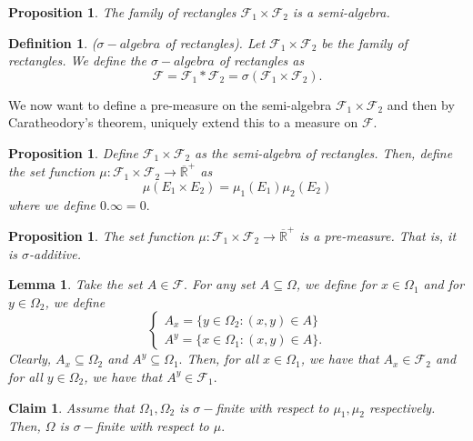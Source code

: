\documentclass[twoside]{article}
\newtheorem{lemma}[theorem]{Lemma}
\newtheorem{proposition}[theorem]{Proposition}
\newtheorem{claim}[theorem]{Claim}
\newtheorem{definition}[theorem]{Definition}
\newcommand{\sigmalgebra}{\mathcal{F}}
\newcommand{\sa}{\sigma-algebra}
\newcommand{\positiveextendedreal}{\overline{\mathbb{R}}^+}
\begin{document}
\begin{proposition}The family of rectangles $\sigmalgebra_1 \times \sigmalgebra_2$ is a semi-algebra.
\end{proposition}

\begin{definition}($\sa$ of rectangles). Let $\sigmalgebra_1 \times \sigmalgebra_2$ be the family of rectangles. We define the $\sa$ of rectangles as 
$$
\sigmalgebra = \sigmalgebra_1 * \sigmalgebra_2 = \sigma(\sigmalgebra_1 \times \sigmalgebra_2).
$$
\end{definition}

We now want to define a pre-measure on the semi-algebra $\sigmalgebra_1 \times \sigmalgebra_2$ and then by Caratheodory's theorem, uniquely extend this to a measure on $\sigmalgebra.$

\begin{proposition}Define $\sigmalgebra_1 \times \sigmalgebra_2$ as the semi-algebra of rectangles. Then, define the set function $\mu: \sigmalgebra_1 \times \sigmalgebra_2 \rightarrow \positiveextendedreal$ as 
$$
\mu(E_1 \times E_2) = \mu_1(E_1)\mu_2(E_2)
$$
where we define $0.\infty = 0.$
\end{proposition}

\begin{proposition}The set function $\mu: \sigmalgebra_1 \times \sigmalgebra_2 \rightarrow \positiveextendedreal$ is a pre-measure. That is, it is $\sigma$-additive.
\end{proposition}

\begin{lemma}Take the set $A \in \sigmalgebra.$ For any set $A \subseteq \Omega$, we define for $x \in \Omega_1$ and for $y \in \Omega_2$, we define
$$
\begin{cases}
A_x = \{y \in \Omega_2: (x,y) \in A\}\\
A^y = \{x \in \Omega_1: (x,y) \in A\}. 
\end{cases}
$$
Clearly, $A_x \subseteq \Omega_2$ and $A^y \subseteq \Omega_1.$ Then, for all $x \in \Omega_1$, we have that $A_x \in \sigmalgebra_2$ and for all $y \in \Omega_2$, we have that $A^y \in \sigmalgebra_1.$
\end{lemma}

\begin{claim}Assume that $\Omega_1, \Omega_2$ is $\sigma-$finite with respect to $\mu_1, \mu_2$ respectively. Then, $\Omega$ is $\sigma-$finite with respect to $\mu.$ 
\end{claim}
\end{document}
